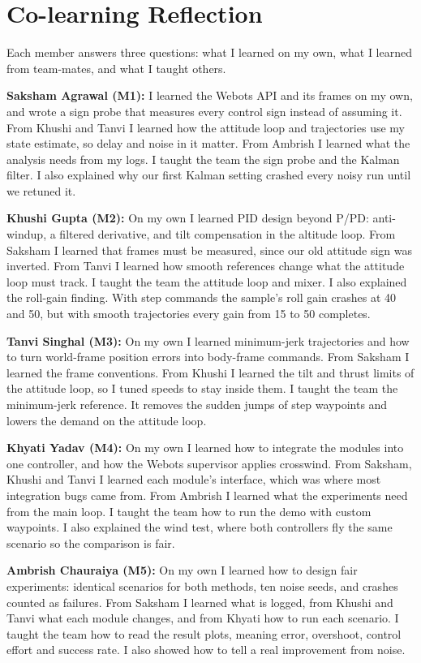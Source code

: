\section{Co-learning Reflection}
Each member answers three questions: what I learned on my own, what I learned from team-mates, and what I taught others.

\textbf{Saksham Agrawal (M1):} I learned the Webots API and its frames on my own, and wrote a sign probe that measures every control sign instead of assuming it. From Khushi and Tanvi I learned how the attitude loop and trajectories use my state estimate, so delay and noise in it matter. From Ambrish I learned what the analysis needs from my logs. I taught the team the sign probe and the Kalman filter. I also explained why our first Kalman setting crashed every noisy run until we retuned it.

\textbf{Khushi Gupta (M2):} On my own I learned PID design beyond P/PD: anti-windup, a filtered derivative, and tilt compensation in the altitude loop. From Saksham I learned that frames must be measured, since our old attitude sign was inverted. From Tanvi I learned how smooth references change what the attitude loop must track. I taught the team the attitude loop and mixer. I also explained the roll-gain finding. With step commands the sample's roll gain crashes at 40 and 50, but with smooth trajectories every gain from 15 to 50 completes.

\textbf{Tanvi Singhal (M3):} On my own I learned minimum-jerk trajectories and how to turn world-frame position errors into body-frame commands. From Saksham I learned the frame conventions. From Khushi I learned the tilt and thrust limits of the attitude loop, so I tuned speeds to stay inside them. I taught the team the minimum-jerk reference. It removes the sudden jumps of step waypoints and lowers the demand on the attitude loop.

\textbf{Khyati Yadav (M4):} On my own I learned how to integrate the modules into one controller, and how the Webots supervisor applies crosswind. From Saksham, Khushi and Tanvi I learned each module's interface, which was where most integration bugs came from. From Ambrish I learned what the experiments need from the main loop. I taught the team how to run the demo with custom waypoints. I also explained the wind test, where both controllers fly the same scenario so the comparison is fair.

\textbf{Ambrish Chauraiya (M5):} On my own I learned how to design fair experiments: identical scenarios for both methods, ten noise seeds, and crashes counted as failures. From Saksham I learned what is logged, from Khushi and Tanvi what each module changes, and from Khyati how to run each scenario. I taught the team how to read the result plots, meaning error, overshoot, control effort and success rate. I also showed how to tell a real improvement from noise.
